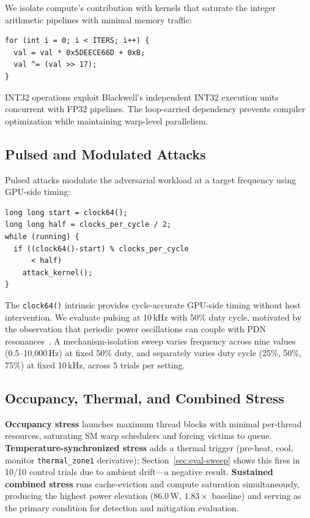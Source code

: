 \documentclass[letterpaper,twocolumn,10pt]{article}
\begin{document}
We isolate compute's contribution with kernels that saturate the
integer arithmetic pipelines with minimal memory traffic:

{\small
\begin{verbatim}
for (int i = 0; i < ITERS; i++) {
  val = val * 0x5DEECE66D + 0xB;
  val ^= (val >> 17);
}
\end{verbatim}}

\noindent INT32 operations exploit Blackwell's independent INT32
execution units concurrent with FP32 pipelines.  The loop-carried
dependency prevents compiler optimization while maintaining
warp-level parallelism.

\subsection{Pulsed and Modulated Attacks}
\label{sec:attack-pulsed}

Pulsed attacks modulate the adversarial workload at a target
frequency using GPU-side timing:

{\small
\begin{verbatim}
long long start = clock64();
long long half = clocks_per_cycle / 2;
while (running) {
  if ((clock64()-start) % clocks_per_cycle
      < half)
    attack_kernel();
}
\end{verbatim}}

\noindent The \texttt{clock64()} intrinsic provides cycle-accurate
GPU-side timing without host intervention.  We evaluate pulsing at
10\,kHz with 50\% duty cycle, motivated by the observation that
periodic power oscillations can couple with PDN
resonances~\cite{yandrofski2022}.
A mechanism-isolation sweep varies frequency across nine values
(0.5--10{,}000\,Hz) at fixed 50\% duty, and separately varies duty
cycle (25\%, 50\%, 75\%) at fixed 10\,kHz, across 5 trials per
setting.

\subsection{Occupancy, Thermal, and Combined Stress}
\label{sec:attack-other}

\textbf{Occupancy stress} launches maximum thread blocks with
minimal per-thread resources, saturating SM warp schedulers and
forcing victims to queue.
\textbf{Temperature-synchronized stress} adds a thermal trigger
(pre-heat, cool, monitor \texttt{thermal\_zone1} derivative);
Section~\ref{sec:eval-sweep} shows this fires in 10/10 control
trials due to ambient drift---a negative result.
\textbf{Sustained combined stress} runs cache-eviction and compute
saturation simultaneously, producing the highest power elevation
(86.0\,W, $1.83\times$ baseline) and serving as the primary
condition for detection and mitigation evaluation.
\end{document}
